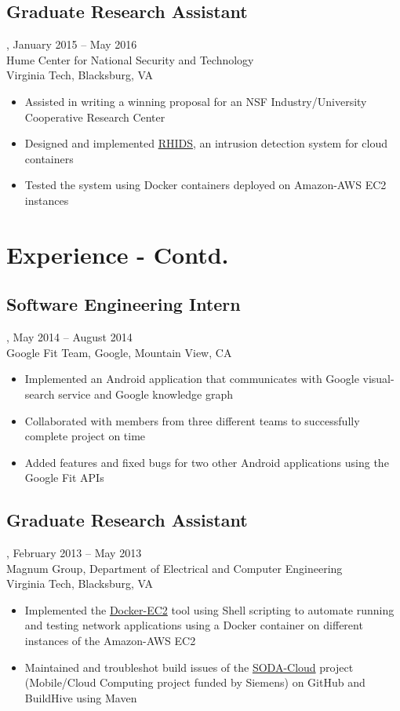 \subsection{Graduate Research Assistant}, January 2015 -- May 2016\\
Hume Center for National Security and Technology\\
Virginia Tech, Blacksburg, VA
\begin{itemize}
\item Assisted in writing a winning proposal for an NSF Industry/University Cooperative Research Center
\item Designed and implemented \href{https://github.com/amrabed/rhids}{RHIDS}, an intrusion detection system for cloud containers
\item Tested the system using Docker containers deployed on Amazon-AWS EC2 instances
\end{itemize}

\newpage
\section{Experience - Contd.}

\subsection{Software Engineering Intern}, May 2014 -- August 2014\\
Google Fit Team, Google, Mountain View, CA
\begin{itemize}
\item Implemented an Android application that communicates with Google visual-search service and Google knowledge graph
\item Collaborated with members from three different teams to successfully complete project on time
\item Added features and fixed bugs for two other Android applications using the Google Fit APIs
\end{itemize}

\subsection{Graduate Research Assistant}, February 2013 -- May 2013\\
Magnum Group, Department of Electrical and Computer Engineering\\
Virginia Tech, Blacksburg, VA
\begin{itemize}
\item Implemented the \href{https://github.com/amrabed/docker-ec2}{Docker-EC2} tool using Shell scripting to automate running and testing network applications using a Docker container on different instances of the Amazon-AWS EC2
\item Maintained and troubleshot build issues of the \href{https://github.com/VT-Magnum-Research/sodacloud}{SODA-Cloud} project (Mobile/Cloud Computing project funded by Siemens) on GitHub and BuildHive using Maven
\end{itemize}

